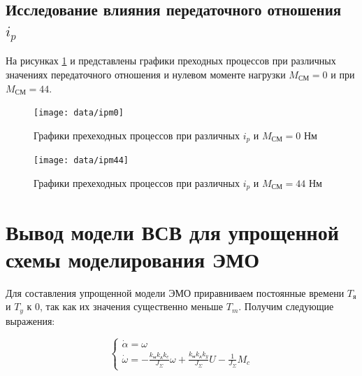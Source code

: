 \documentclass[a4paper, 12pt]{article}
\begin{document}
\newpage
\begin{center}
	\section{Исследование влияния передаточного отношения $i_p$}
\end{center}\par
На рисунках \ref{ipm0} и представлены графики преходных процессов при различных значениях передаточного отношения и нулевом моменте нагрузки $M_\text{СМ} = 0$ и при $M_\text{СМ} = 44$.

\begin{figure}[h!]
	\centering
	\texttt{[image: data/ipm0]}
	\caption{Графики прехеходных процессов при различных $i_p$ и $M_\text{СМ} = 0$ Нм}
	\label{ipm0}
\end{figure}
\newpage
\begin{figure}[h!]
	\centering
	\texttt{[image: data/ipm44]}
	\caption{Графики прехеходных процессов при различных $i_p$ и $M_\text{СМ} = 44$ Нм}
	\label{ipm44}
\end{figure}
\newpage
\section{Вывод модели ВСВ для упрощенной схемы моделирования ЭМО}
Для составления упрощенной модели ЭМО приравниваем постоянные времени $T_\text{я}$ и $T_y$ к 0, так как их значения существенно меньше $T_m$. Получим следующие выражения:

\begin{equation}
\begin{cases}
\dot{\alpha} = \omega \\
\dot{\omega} = -\frac{k_\text{м}k_\text{д}k_e}{J_\Sigma}\omega + \frac{k_\text{м}k_\text{д}k_y}{J_\Sigma}U - \frac{1}{J_\Sigma}M_c
\end{cases}
\end{equation}
\end{document}

